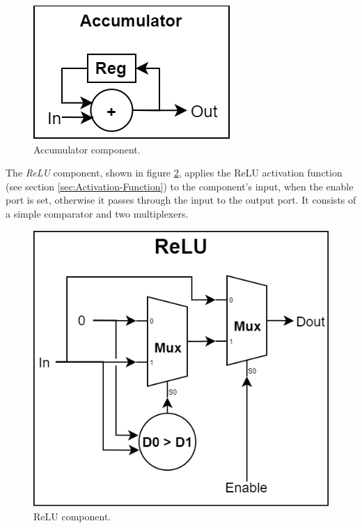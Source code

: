 \begin{figure} [H]
	\centering
	\includegraphics[scale=0.4]{Images/Platform/Accumulator_component.png}
	\decoRule
	\caption[Accumulator component]{Accumulator component.}
	\label{fig:accumulator-component}
\end{figure}

The \emph{ReLU} component, shown in figure \ref{fig:relu-component}, applies the ReLU activation function (see section \ref{sec:Activation-Function}) to the component's input, when the enable port is set, otherwise it passes through the input to the output port. It consists of a simple comparator and two multiplexers.

\begin{figure} [H]
	\centering
	\includegraphics[scale=0.4]{Images/Platform/ReLU_component.png}
	\decoRule
	\caption[ReLU component]{ReLU component.}
	\label{fig:relu-component}
\end{figure}

